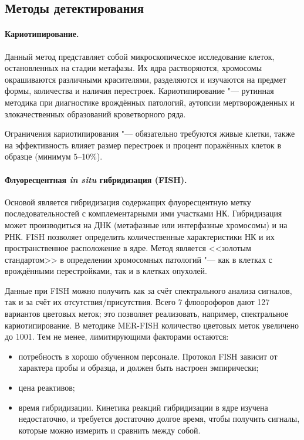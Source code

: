 \documentclass[a4paper,12pt]{article}
\begin{document}
\subsection{Методы детектирования}

\paragraph{Кариотипирование.}
Данный метод представляет собой микроскопическое исследование клеток, остановленных на стадии метафазы.
Их ядра растворяются, хромосомы окрашиваются различными красителями, разделяются и изучаются на предмет формы, количества и наличия перестроек.
Кариотипирование "--- рутинная методика при диагностике врождённых патологий, аутопсии мертворожденных и злокачественных образований кроветворного ряда.

Ограничения кариотипирования "--- обязательно требуются живые клетки, также на эффективность влияет размер перестроек и процент поражённых клеток в образце (минимум 5--10\%)\cite{sampson}.

\paragraph{Флуоресцентная \textit{in situ} гибридизация (FISH).}
Основой является гибридизация содержащих флуоресцентную метку последовательностей с комплементарными ими участками НК.
Гибридизация может производиться на ДНК (метафазные или интерфазные хромосомы) и на РНК.
FISH позволяет определить количественные характеристики НК и их пространственное расположение в ядре.
Метод является <<золотым стандартом>> в определении хромосомных патологий "--- как в клетках с врождёнными перестройками, так и в клетках опухолей.

Данные при FISH можно получить как за счёт спектрального анализа сигналов, так и за счёт их отсутствия/присутствия.
Всего 7 флюорофоров дают 127 вариантов цветовых меток; это позволяет реализовать, например, спектральное кариотипирование.
В методике MER-FISH количество цветовых меток увеличено до 1001.
Тем не менее, лимитирующими факторами остаются:

\begin{itemize}
\item потребность в хорошо обученном персонале. 
Протокол FISH зависит от характера пробы и образца, и должен быть настроен эмпирически;
\item цена реактивов;
\item время гибридизации.
Кинетика реакций гибридизации в ядре изучена недостаточно, и требуется достаточно долгое время, чтобы получить сигналы, которые можно измерить и сравнить между собой.
\end{itemize}
\end{document}
